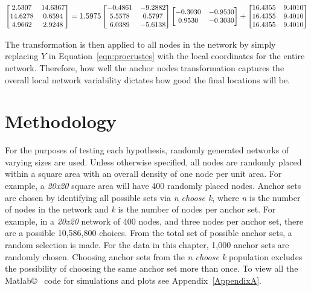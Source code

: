 \begin{equation}\label{eqn:sampleProcrustes1}
{\small\begin{bmatrix}  2.5307  & 14.6367 \\
   14.6278  &  0.6594 \\
    4.9662  &  2.9248\end{bmatrix}=1.5975\begin{bmatrix}
   -0.4861  & -9.2882 \\
    5.5578  &  0.5797 \\
    6.0389  & -5.6138\end{bmatrix}\begin{bmatrix}
	-0.3030 & -0.9530 \\
    0.9530  & -0.3030
\end{bmatrix}+\begin{bmatrix}
16.4355 & 9.4010 \\
16.4355 & 9.4010 \\
16.4355 & 9.4010\end{bmatrix}}
\end{equation}

The transformation is then applied to all nodes in the network by simply replacing $Y$ in Equation~\ref{eqn:procrustes} with the local coordinates for the entire network. Therefore, how well the anchor nodes transformation captures the overall local network variability dictates how good the final locations will be.

\section{Methodology}
For the purposes of testing each hypothesis, randomly generated networks of varying sizes are used.  Unless otherwise specified, all nodes are randomly placed within a square area with an overall density of one node per unit area.  For example, a \emph{20x20} square area will have 400 randomly placed nodes.  Anchor sets are chosen by identifying all possible sets via \emph{n choose k}, where \emph{n} is the number of nodes in the network and \emph{k} is the number of nodes per anchor set.  For example, in a \emph{20x20} network of 400 nodes, and three nodes per anchor set, there are a possible 10,586,800 choices.  From the total set of possible anchor sets, a random selection is made.  For the data in this chapter, 1,000 anchor sets are randomly chosen.  Choosing anchor sets from the \emph{n choose k} population excludes the possibility of choosing the same anchor set more than once. To view all the Matlab\copyright~ code for simulations and plots see Appendix~\ref{AppendixA}.

